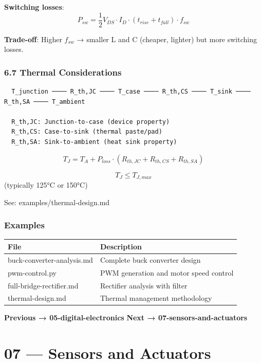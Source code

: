 \documentclass[11pt,a4paper]{book}
\begin{document}
\textbf{Switching losses}:
\[P_{sw} = \frac{1}{2} V_{DS} \cdot I_D \cdot (t_{rise} + t_{fall}) \cdot f_{sw}\]

\textbf{Trade-off}: Higher $f_{sw}$ → smaller L and C (cheaper, lighter) but more switching losses.

\medskip\noindent\hrulefill\medskip

\subsection{6.7 Thermal Considerations}

\begin{lstlisting}
  T_junction ──── R_th,JC ──── T_case ──── R_th,CS ──── T_sink ──── R_th,SA ──── T_ambient
  
  R_th,JC: Junction-to-case (device property)
  R_th,CS: Case-to-sink (thermal paste/pad)
  R_th,SA: Sink-to-ambient (heat sink property)
\end{lstlisting}

\[T_J = T_A + P_{loss} \cdot (R_{th,JC} + R_{th,CS} + R_{th,SA})\]

$$T_J \leq T_{J,max}$$ (typically 125°C or 150°C)

See: examples/thermal-design.md

\medskip\noindent\hrulefill\medskip

\subsection{Examples}

\begin{center}
\begin{tabular}{|l|l|}
\hline
File & Description \\
\hline
buck-converter-analysis.md & Complete buck converter design \\
pwm-control.py & PWM generation and motor speed control \\
full-bridge-rectifier.md & Rectifier analysis with filter \\
thermal-design.md & Thermal management methodology \\
\hline
\end{tabular}
\end{center}

\medskip\noindent\hrulefill\medskip

\textbf{Previous → 05-digital-electronics}  
\textbf{Next → 07-sensors-and-actuators}


\chapter{07 — Sensors and Actuators}
\end{document}

